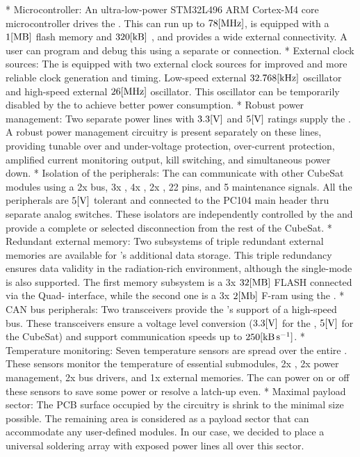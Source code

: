 \begitems
    * {\sbf Microcontroller:} An ultra-low-power STM32L496 ARM Cortex-M4 core microcontroller drives the . This  can run up to $78\rm{[MHz]}$, is equipped with a $1\rm{[MB]}$ flash memory and $320\rm{[kB]}$ , and provides a wide external connectivity. A user can program and debug this  using a separate  or  connection.
    * {\sbf External clock sources:} The  is equipped with two external clock sources for improved and more reliable clock generation and timing. Low-speed external $32.768\rm{[kHz]}$ oscillator and high-speed external $26\rm{[MHz]}$ oscillator. This oscillator can be temporarily disabled by the  to achieve better power consumption.
    * {\sbf Robust power management:} Two separate power lines with $3.3\rm{[V]}$ and $5\rm{[V]}$ ratings supply the . A robust power management circuitry is present separately on these lines, providing tunable over and under-voltage protection, over-current protection, amplified current monitoring output, kill switching, and simultaneous power down.
    * {\sbf Isolation of the peripherals:} The  can communicate with other CubeSat modules using a 2x  bus, 3x , 4x , 2x , 22  pins, and 5 maintenance signals. All the peripherals are $5\rm{[V]}$ tolerant and connected to the PC104 main header thru separate analog switches. These isolators are independently controlled by the  and provide a complete or selected disconnection from the rest of the CubeSat.
    * {\sbf Redundant external memory:} Two subsystems of triple redundant external memories are available for 's additional data storage. This triple redundancy ensures data validity in the radiation-rich environment, although the single-mode is also supported. The first memory subsystem is a 3x $32\rm{[MB]}$ FLASH connected via the Quad- interface, while the second one is a 3x $2\rm{[Mb]}$ F-ram using the .
    * {\sbf CAN bus peripherals:} Two  transceivers provide the 's support of a high-speed  bus.  These transceivers ensure a voltage level conversion ($3.3\rm{[V]}$ for the , $5\rm{[V]}$ for the CubeSat) and support communication speeds up to $250\rm{[kB\,s^{-1}]}$.
    * {\sbf Temperature monitoring:} Seven  temperature sensors are spread over the entire . These sensors monitor the temperature of essential submodules, 2x , 2x power management, 2x  bus drivers, and 1x external memories. The  can power on or off these sensors to save some power or resolve a latch-up even.
    * {\sbf Maximal payload sector:} The PCB surface occupied by the  circuitry is shrink to the minimal size possible. The remaining area is considered as a payload sector that can accommodate any user-defined modules. In our case, we decided to place a universal soldering array with exposed power lines all over this sector.
\enditems



